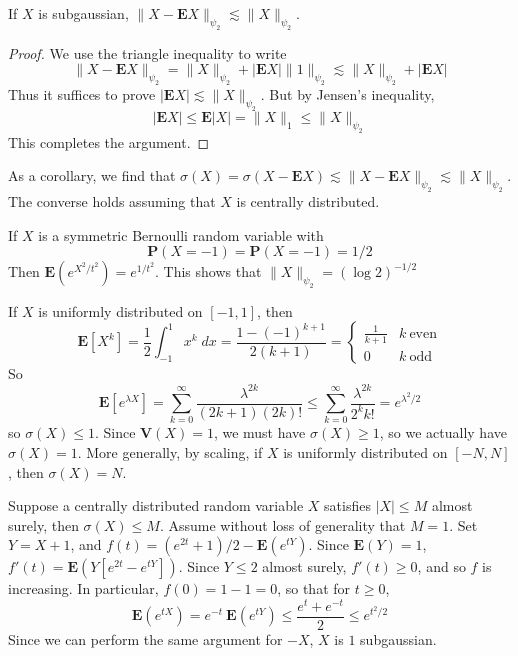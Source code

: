 \begin{lemma}
    If $X$ is subgaussian, $\| X - \mathbf{E} X \|_{\psi_2} \lesssim \| X \|_{\psi_2}$.
\end{lemma}
\begin{proof}
    We use the triangle inequality to write
    \[ \| X - \mathbf{E }X \|_{\psi_2} = \| X \|_{\psi_2} + | \mathbf{E} X | \| 1 \|_{\psi_2} \lesssim \| X \|_{\psi_2} + | \mathbf{E} X | \]
    Thus it suffices to prove $|\mathbf{E} X | \lesssim \| X \|_{\psi_2}$. But by Jensen's inequality,
    \[ |\mathbf{E} X| \leq \mathbf{E} |X| = \| X \|_1 \leq \| X \|_{\psi_2} \]
    This completes the argument.
\end{proof}

As a corollary, we find that $\sigma(X) = \sigma(X - \mathbf{E} X) \lesssim \| X - \mathbf{E} X \|_{\psi_2} \lesssim \| X \|_{\psi_2}$. The converse holds assuming that $X$ is centrally distributed.

\begin{example}
    If $X$ is a symmetric Bernoulli random variable with
    \[ \mathbf{P}(X = -1) = \mathbf{P}(X = -1) = 1/2 \]
    Then $\mathbf{E}(e^{X^2/t^2}) = e^{1/t^2}$. This shows that $\| X \|_{\psi_2} = (\log 2)^{-1/2}$
\end{example}

\begin{example}
    If $X$ is uniformly distributed on $[-1,1]$, then
    \[ \mathbf{E}[X^k] = \frac{1}{2} \int_{-1}^1 x^k\; dx = \frac{1 - (-1)^{k+1}}{2(k+1)} = \begin{cases} \frac{1}{k+1} & k\ \text{even} \\ 0 & k\ \text{odd} \end{cases} \]
    So
    \[ \mathbf{E}[e^{\lambda X}] = \sum_{k = 0}^\infty \frac{\lambda^{2k}}{(2k+1)(2k)!} \leq \sum_{k = 0}^\infty \frac{\lambda^{2k}}{2^k k!} = e^{\lambda^2/2} \]
    so $\sigma(X) \leq 1$. Since $\mathbf{V}(X) = 1$, we must have $\sigma(X) \geq 1$, so we actually have $\sigma(X) = 1$. More generally, by scaling, if $X$ is uniformly distributed on $[-N,N]$, then $\sigma(X) = N$.
\end{example}

\begin{example}
    Suppose a centrally distributed random variable $X$ satisfies $|X| \leq M$ almost surely, then $\sigma(X) \leq M$. Assume without loss of generality that $M = 1$. Set $Y = X+1$, and $f(t) = (e^{2t} + 1)/2 - \mathbf{E}(e^{tY})$. Since $\mathbf{E}(Y) = 1$, $f'(t) = \mathbf{E}(Y[e^{2t} - e^{tY}])$. Since $Y \leq 2$ almost surely, $f'(t) \geq 0$, and so $f$ is increasing. In particular, $f(0) = 1 - 1 = 0$, so that for $t \geq 0$,
    \[ \mathbf{E}(e^{tX}) = e^{-t}\ \mathbf{E}(e^{tY}) \leq \frac{e^{t} + e^{-t}}{2} \leq e^{t^2/2} \]
    Since we can perform the same argument for $-X$, $X$ is $1$ subgaussian.
\end{example}







